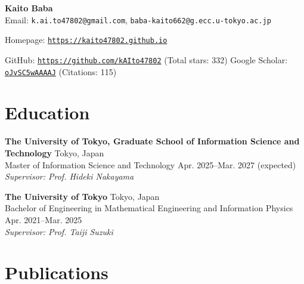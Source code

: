 \documentclass{article}
\begin{document}
\setlength{\parindent}{0pt}

\begin{center}
  {\Large \bf \color{primary} Kaito Baba}\\[2pt]

  Email: \texttt{k.ai.to47802@gmail.com}, \texttt{baba-kaito662@g.ecc.u-tokyo.ac.jp}

  Homepage: \texttt{\url{https://kaito47802.github.io}}

  GitHub: \texttt{\url{https://github.com/kAIto47802}} (Total stars: 332)
  \hspace{1mm}
  Google Scholar: \texttt{\href{https://scholar.google.com/citations?user=oJvSC5wAAAAJ}{oJvSC5wAAAAJ}} (Citations: 115)
\end{center}


\section{Education}

\textbf{The University of Tokyo, Graduate School of Information Science and Technology}
\hspace{\fill}Tokyo, Japan\\
Master of Information Science and Technology
\hspace{\fill}Apr. 2025--Mar. 2027 (expected)\\
\textit{Supervisor: Prof. Hideki Nakayama}
\vspace{2mm}

\textbf{The University of Tokyo}
\hspace{\fill}Tokyo, Japan\\
Bachelor of Engineering in Mathematical Engineering and Information Physics
\hspace{\fill}Apr. 2021--Mar. 2025\\
\textit{Supervisor: Prof. Taiji Suzuki}


\section{Publications}


\end{document}
